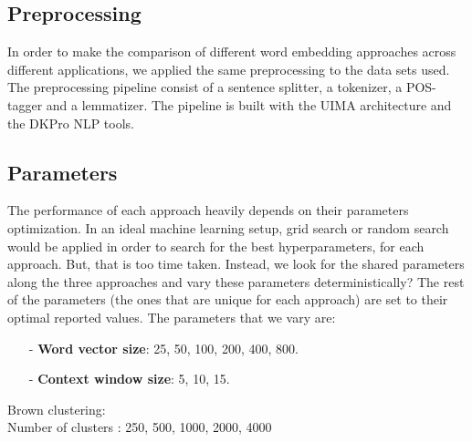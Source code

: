 \documentclass[11pt]{article}
\begin{document}
\subsection{Preprocessing}

In order to make the comparison of different word embedding approaches across different applications, we applied the same preprocessing to the data sets used. 
The preprocessing pipeline consist of a sentence splitter, a tokenizer, a POS-tagger and a lemmatizer. The pipeline is built with the UIMA architecture and the DKPro NLP tools. 


\subsection{Parameters}

The performance of each approach heavily depends on their parameters optimization.
In an ideal machine learning setup, grid search or random search would be applied in order to search for the best hyperparameters, for each approach.
But, that is too time taken. Instead, we look for the shared parameters along the three approaches and vary these parameters deterministically? 
The rest of the parameters (the ones that are unique for each approach) are set to  their optimal reported values.
The parameters that we vary are:


\begin{small}
\begin{itemize}
\item[-]\textbf{Word vector size}: 25, 50, 100, 200, 400, 800.
\item[-]\textbf{Context window size}: 5, 10, 15.
\end{itemize}
\end{small}

\noindent
Brown clustering:\\
\noindent
Number of clusters : 250, 500, 1000, 2000, 4000 

\end{document}

